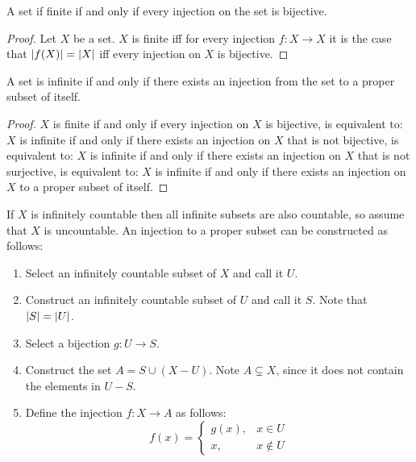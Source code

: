 \documentclass[letterpaper,12pt,fleqn]{article}
\begin{document}
\begin{theorem}
  A set if finite if and only if every injection on the set is bijective.
\end{theorem}

\begin{proof}
  Let \(X\) be a set.  \(X\) is finite iff for every injection \(f:X\to X\) it is the case that
  \(\lvert f(X)\rvert=\lvert X\rvert\) iff every injection on \(X\) is bijective.
\end{proof}

\begin{theorem}
  A set is infinite if and only if there exists an injection from the set to a proper subset of itself.
\end{theorem}

\begin{proof}
  \(X\) is finite if and only if every injection on \(X\) is bijective, is equivalent to:
  \(X\) is infinite if and only if there exists an injection on \(X\) that is not bijective, is equivalent to:
  \(X\) is infinite if and only if there exists an injection on \(X\) that is not surjective, is equivalent to:
  \(X\) is infinite if and only if there exists an injection on \(X\) to a proper subset of itself.
\end{proof}

\begin{example}
  If \(X\) is infinitely countable then all infinite subsets are also countable, so assume that \(X\) is uncountable.
  An injection to a proper subset can be constructed as follows:
  \begin{enumerate}
  \item Select an infinitely countable subset of \(X\) and call it \(U\).
  \item Construct an infinitely countable subset of \(U\) and call it \(S\).  Note that \(\lvert S\rvert=\lvert U\rvert\).
  \item Select a bijection \(g:U\to S\).
  \item Construct the set \(A=S\cup(X-U)\).  Note \(A\subsetneq X\), since it does not contain the elements in
    \(U-S\).
  \item Define the injection \(f:X\to A\) as follows:
    \[f(x)=\begin{cases}
    g(x), & x\in U \\
    x, & x\notin U
    \end{cases}\]
  \end{enumerate}
\end{example}
\end{document}
